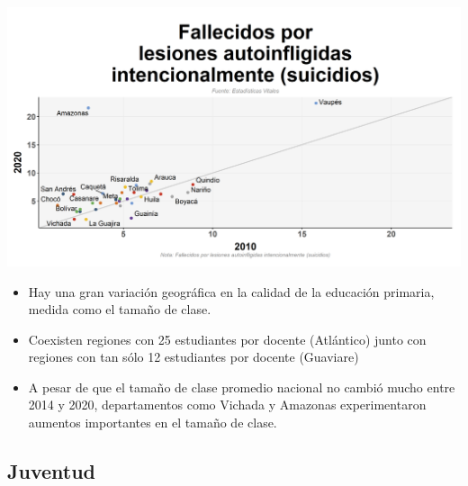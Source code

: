 \documentclass[aspectratio=169]{beamer}
\begin{document}
            \begin{slide}{13} 
                      \begin{imagecolumn}
                \includegraphics[width=\columnwidth]{img/var_324_scatter_time.png}
            \end{imagecolumn}
            \begin{textcolumn}
                \begin{itemize}
                    \item Hay una gran variación geográfica en la calidad de la educación primaria, medida como el tamaño de clase. 
                    \item Coexisten regiones con 25 estudiantes por docente (Atlántico) junto con regiones con tan sólo 12 estudiantes por docente (Guaviare)  
                    \item A pesar de que el tamaño de clase promedio nacional no cambió mucho entre 2014 y 2020, departamentos como Vichada y Amazonas experimentaron aumentos importantes en el tamaño de clase.
                \end{itemize}
            \end{textcolumn}

    \printcolumns
    \end{slide}
    
    
    \subsection{Juventud}
    
\end{document}
